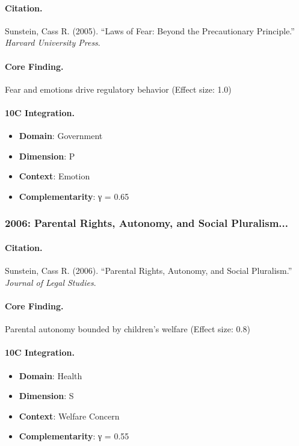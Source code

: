 \paragraph{Citation.}
Sunstein, Cass R. (2005). ``Laws of Fear: Beyond the Precautionary Principle.''
\textit{Harvard University Press}.

\paragraph{Core Finding.}
Fear and emotions drive regulatory behavior (Effect size: 1.0)

\paragraph{10C Integration.}
\begin{itemize}[nosep]
  \item \textbf{Domain}: Government
  \item \textbf{Dimension}: P
  \item \textbf{Context}: Emotion
  \item \textbf{Complementarity}: γ = 0.65
\end{itemize}

\subsubsection{2006: Parental Rights, Autonomy, and Social Pluralism...}

\paragraph{Citation.}
Sunstein, Cass R. (2006). ``Parental Rights, Autonomy, and Social Pluralism.''
\textit{Journal of Legal Studies}.

\paragraph{Core Finding.}
Parental autonomy bounded by children's welfare (Effect size: 0.8)

\paragraph{10C Integration.}
\begin{itemize}[nosep]
  \item \textbf{Domain}: Health
  \item \textbf{Dimension}: S
  \item \textbf{Context}: Welfare Concern
  \item \textbf{Complementarity}: γ = 0.55
\end{itemize}

